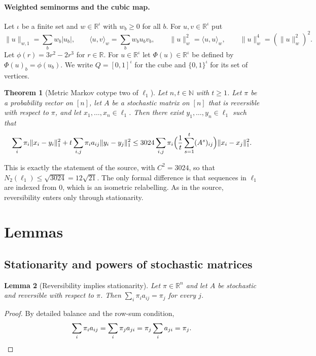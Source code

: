 \documentclass[11pt]{article}
\newtheorem{theorem}{Theorem}[section]
\newtheorem{lemma}[theorem]{Lemma}
\theoremstyle{definition}
\theoremstyle{remark}
\newcommand{\R}{\mathbb{R}}
\newcommand{\N}{\mathbb{N}}
\newcommand{\wn}[1]{\lVert #1\rVert_{w,1}}
\newcommand{\hn}[1]{\lVert #1\rVert_{w}}
\newcommand{\ip}[2]{\langle #1,#2\rangle_{w}}
\newcommand{\lnorm}[1]{\lVert #1\rVert_{1}}
\begin{document}
\paragraph{Weighted seminorms and the cubic map.}
Let $\iota$ be a finite set and $w\in\R^\iota$ with $w_b\ge0$ for all $b$. For $u,v\in\R^\iota$ put
\[
\wn{u}=\sum_{b}w_b|u_b|,\qquad \ip uv=\sum_bw_bu_bv_b,\qquad \hn u^2=\ip uu,\qquad \hn u^4=(\hn u^2)^2 .
\]
Let $\phi(r)=3r^2-2r^3$ for $r\in\R$. For $u\in\R^\iota$ let $\Phi(u)\in\R^\iota$ be defined by $\Phi(u)_b=\phi(u_b)$. We write $Q=[0,1]^\iota$ for the cube and $\{0,1\}^\iota$ for its set of vertices.

\begin{theorem}[Metric Markov cotype two of $\ell_1$]\label{thm:main}
Let $n,t\in\N$ with $t\ge1$. Let $\pi$ be a probability vector on $[n]$, let $A$ be a stochastic matrix on $[n]$ that is reversible with respect to $\pi$, and let $x_1,\dots,x_n\in\ell_1$. Then there exist $y_1,\dots,y_n\in\ell_1$ such that
\[
\sum_i\pi_i\lnorm{x_i-y_i}^2+t\sum_{i,j}\pi_ia_{ij}\lnorm{y_i-y_j}^2
\le 3024\sum_{i,j}\pi_i\Bigl(\frac1t\sum_{s=1}^t(A^s)_{ij}\Bigr)\lnorm{x_i-x_j}^2 .
\]
\end{theorem}

This is exactly the statement of the source, with $C^2=3024$, so that $N_2(\ell_1)\le\sqrt{3024}=12\sqrt{21}$. The only formal difference is that sequences in $\ell_1$ are indexed from $0$, which is an isometric relabelling. As in the source, reversibility enters only through stationarity.

\section{Lemmas}

\subsection{Stationarity and powers of stochastic matrices}

\begin{lemma}[Reversibility implies stationarity]\label{lem:mc_stationary}
Let $\pi\in\R^n$ and let $A$ be stochastic and reversible with respect to $\pi$. Then $\sum_i\pi_ia_{ij}=\pi_j$ for every $j$.
\end{lemma}
\begin{proof}
By detailed balance and the row-sum condition,
\[
\sum_i\pi_ia_{ij}=\sum_i\pi_ja_{ji}=\pi_j\sum_ia_{ji}=\pi_j. \qedhere
\]
\end{proof}
\end{document}
